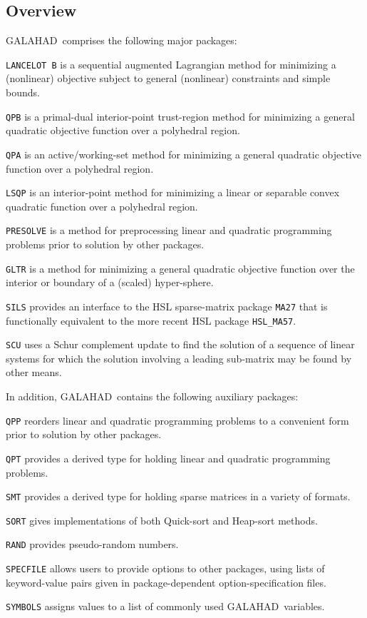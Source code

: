 \documentclass[acmtocl,acmnow]{acmtrans2m}
\newcommand{\gal}{{\sf GALAHAD}}
\newcommand{\itt}[1]{\item{{\tt #1}}}
\newcommand{\lsubsection}[1]{\subsection{#1} \label{#1}}
\begin{document}
\lsubsection{Overview}

\gal\ comprises the following major packages:

\begin{description}

\itt{LANCELOT B} is a sequential augmented Lagrangian method for
minimizing a (nonlinear) objective subject to general (nonlinear) constraints
and simple bounds.

\itt{QPB} is a primal-dual interior-point trust-region method for
minimizing a general quadratic objective function over a polyhedral region.

\itt{QPA} is an active/working-set method for
minimizing a general quadratic objective function over a polyhedral region.

\itt{LSQP} is an interior-point method for minimizing a linear or
separable convex quadratic function over a polyhedral region.

\itt{PRESOLVE} is a method for preprocessing linear and quadratic programming
problems prior to solution by other packages.

\itt{GLTR} is a method for minimizing a general quadratic objective function
over the interior or boundary of a (scaled) hyper-sphere.

\itt{SILS} provides an interface to the HSL sparse-matrix package {\tt MA27}
that is functionally equivalent to the more recent HSL package {\tt HSL\_MA57}.

\itt{SCU} uses a Schur complement update to find the solution of
a sequence of linear systems for which the solution
involving a leading sub-matrix may be found by other means.

\end{description}
In addition, \gal\ contains the following auxiliary packages:

\begin{description}

\itt{QPP} reorders linear and quadratic programming
problems to a convenient form prior to solution by other packages.

\itt{QPT} provides a derived type for holding linear and quadratic programming
problems.

\itt{SMT} provides a derived type for holding sparse matrices in a variety of
formats.

\itt{SORT} gives implementations of both Quick-sort and Heap-sort methods.

\itt{RAND} provides pseudo-random numbers.

\itt{SPECFILE} allows users to provide options to other packages, using lists
of keyword-value pairs given in package-dependent option-specification files.

\itt{SYMBOLS} assigns values to a list of commonly used \gal\ variables.

\end{description}
\end{document}
